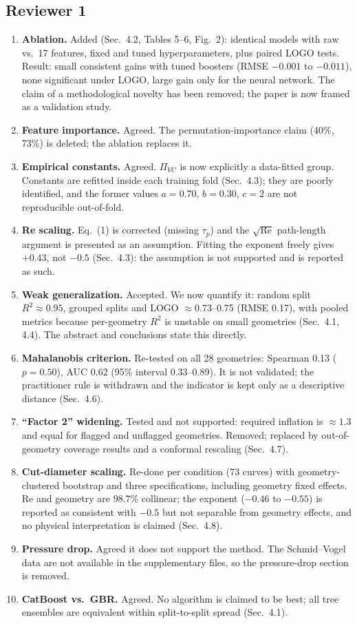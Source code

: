 \documentclass[11pt]{article}\usepackage[margin=2.3cm]{geometry}\usepackage{enumitem}\setlength{\parindent}{0pt}\setlength{\parskip}{4pt}
\begin{document}
\subsection*{Reviewer 1}
\begin{enumerate}[leftmargin=*,label=(\arabic*)]
\item \textbf{Ablation.} Added (Sec.~4.2, Tables 5--6, Fig.~2): identical models with raw vs.\ 17 features, fixed and tuned hyperparameters, plus paired LOGO tests. Result: small consistent gains with tuned boosters (RMSE $-0.001$ to $-0.011$), none significant under LOGO, large gain only for the neural network. The claim of a methodological novelty has been removed; the paper is now framed as a validation study.
\item \textbf{Feature importance.} Agreed. The permutation-importance claim (40\%, 73\%) is deleted; the ablation replaces it.
\item \textbf{Empirical constants.} Agreed. $\Pi_{VC}$ is now explicitly a data-fitted group. Constants are refitted inside each training fold (Sec.~4.3); they are poorly identified, and the former values $a=0.70$, $b=0.30$, $c=2$ are not reproducible out-of-fold.
\item \textbf{Re scaling.} Eq.~(1) is corrected (missing $\tau_p$) and the $\sqrt{\mathrm{Re}}$ path-length argument is presented as an assumption. Fitting the exponent freely gives $+0.43$, not $-0.5$ (Sec.~4.3): the assumption is not supported and is reported as such.
\item \textbf{Weak generalization.} Accepted. We now quantify it: random split $R^2\approx0.95$, grouped splits and LOGO $\approx0.73$--0.75 (RMSE 0.17), with pooled metrics because per-geometry $R^2$ is unstable on small geometries (Sec.~4.1, 4.4). The abstract and conclusions state this directly.
\item \textbf{Mahalanobis criterion.} Re-tested on all 28 geometries: Spearman 0.13 ($p=0.50$), AUC 0.62 (95\% interval 0.33--0.89). It is not validated; the practitioner rule is withdrawn and the indicator is kept only as a descriptive distance (Sec.~4.6).
\item \textbf{``Factor 2'' widening.} Tested and not supported: required inflation is $\approx1.3$ and equal for flagged and unflagged geometries. Removed; replaced by out-of-geometry coverage results and a conformal rescaling (Sec.~4.7).
\item \textbf{Cut-diameter scaling.} Re-done per condition (73 curves) with geometry-clustered bootstrap and three specifications, including geometry fixed effects. Re and geometry are 98.7\% collinear; the exponent ($-0.46$ to $-0.55$) is reported as consistent with $-0.5$ but not separable from geometry effects, and no physical interpretation is claimed (Sec.~4.8).
\item \textbf{Pressure drop.} Agreed it does not support the method. The Schmid--Vogel data are not available in the supplementary files, so the pressure-drop section is removed.
\item \textbf{CatBoost vs.\ GBR.} Agreed. No algorithm is claimed to be best; all tree ensembles are equivalent within split-to-split spread (Sec.~4.1).
\end{enumerate}
\end{document}
